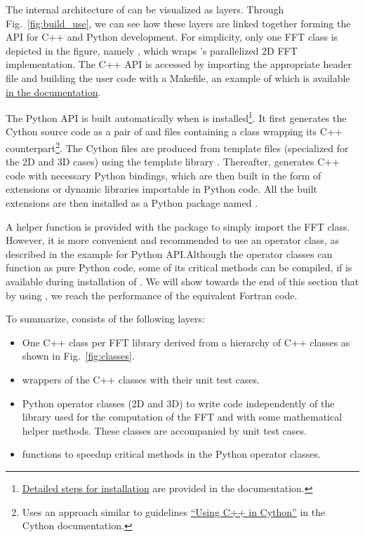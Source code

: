 \documentclass{../jors}
\begin{document}
The internal architecture of  can be visualized as layers.  Through
Fig.~\ref{fig:build_use}, we can see how these layers are linked together forming
the API for C++ and Python development. For simplicity, only one FFT class is
depicted in the figure, namely , which wraps
's parallelized 2D FFT implementation. The C++ API is accessed by
importing the appropriate header file and building the user code with a Makefile,
an example of which is available \href{%
https://fluidfft.readthedocs.io/en/latest/examples/cpp.html}{%
in the documentation}.

The Python API is built automatically when  is
installed\footnote{%
\href{https://fluidfft.readthedocs.io/en/latest/install.html}{Detailed steps
for installation} are provided in the documentation.}.
%
It first generates the Cython source code as a pair of  and
 files containing a class wrapping its C++
counterpart\footnote{Uses an approach similar to guidelines \href{%
    https://cython.readthedocs.io/en/latest/src/userguide/wrapping_CPlusPlus.html}{%
``Using C++ in Cython''} in the Cython documentation.}.
%
The Cython files are produced from template files (specialized for the 2D and
3D cases) using the template library \mako.
%
Thereafter,  \citep{behnel_cython2011} generates C++ code with
necessary Python bindings, which are then built in the form of extensions or
dynamic libraries importable in Python code. All the built extensions are then
installed as a Python package named .

A helper function  is provided with the
package to simply import the FFT class. However, it is more convenient and
recommended to use an operator class, as described in the example for Python
API.\@ Although the operator classes can function as pure Python code, some of
its critical methods can be compiled, if 
\citep{guelton2018pythran} is available during installation of
. We will show towards the end of this section that by using
, we reach the performance of the equivalent Fortran code.

To summarize,  consists of the following layers:
\begin{itemize}

\item One C++ class per FFT library derived from a hierarchy of C++ classes
as shown in Fig.~\ref{fig:classes}.

\item {} wrappers of the C++ classes with their unit test cases.

\item Python operator classes (2D and 3D) to write code independently of the
library used for the computation of the FFT and with some mathematical helper
methods. These classes are accompanied by unit test cases.

\item {} functions to speedup critical methods in the Python
operator classes.

\end{itemize}
\end{document}
